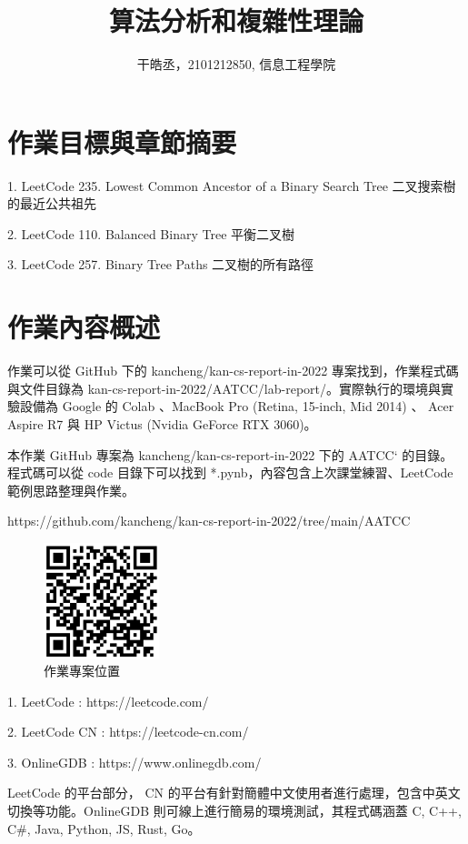 \documentclass[10pt,UTF8]{ctexart}
\title{算法分析和複雜性理論}
\author{干皓丞，2101212850, 信息工程學院}
\begin{document}
\maketitle


\section{作業目標與章節摘要}

1. LeetCode 235. Lowest Common Ancestor of a Binary Search Tree 二叉搜索樹的最近公共祖先

2. LeetCode 110. Balanced Binary Tree 平衡二叉樹

3. LeetCode 257. Binary Tree Paths 二叉樹的所有路徑


\section{作業內容概述}

作業可以從 GitHub 下的 kancheng/kan-cs-report-in-2022 專案找到，作業程式碼與文件目錄為 kan-cs-report-in-2022/AATCC/lab-report/。實際執行的環境與實驗設備為 Google 的 Colab 、MacBook Pro (Retina, 15-inch, Mid 2014) 、 Acer Aspire R7 與 HP Victus (Nvidia GeForce RTX 3060)。

本作業 GitHub 專案為 kancheng/kan-cs-report-in-2022 下的 AATCC` 的目錄。程式碼可以從 code 目錄下可以找到 *.pynb，內容包含上次課堂練習、LeetCode 範例思路整理與作業。

https://github.com/kancheng/kan-cs-report-in-2022/tree/main/AATCC

\begin{figure}[H]
\centering 
\includegraphics[width=0.30\textwidth]{aatccqr.png} 
\caption{作業專案位置}
\label{Test}
\end{figure}


1. LeetCode : https://leetcode.com/

2. LeetCode CN : https://leetcode-cn.com/

3. OnlineGDB : https://www.onlinegdb.com/ 

LeetCode 的平台部分， CN 的平台有針對簡體中文使用者進行處理，包含中英文切換等功能。OnlineGDB 則可線上進行簡易的環境測試，其程式碼涵蓋 C, C++, C\#, Java, Python, JS, Rust, Go。
\end{document}
